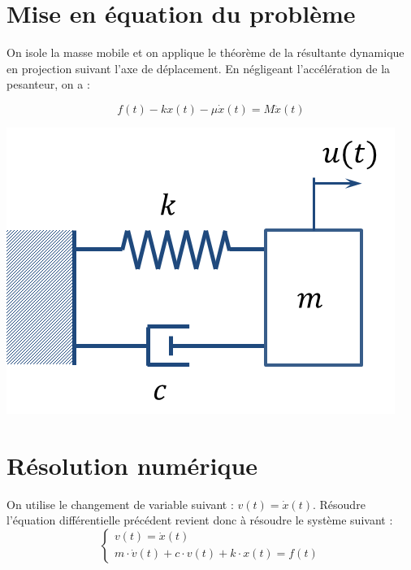 \documentclass[10pt]{article}
\begin{document}
\section{Mise en équation du problème}

\begin{minipage}[c]{.77\linewidth}
On isole la masse mobile et on applique le théorème de la résultante dynamique en projection suivant l'axe de déplacement. En négligeant l'accélération de la pesanteur, on a :

\begin{equation}
f(t)-kx(t)-\mu\dot{x}(t) = M\ddot{x}(t) 
\end{equation}


\end{minipage} \hfill
\begin{minipage}[c]{.2\linewidth}
\includegraphics[width=\textwidth]{images/cellule}
\end{minipage}

\section{Résolution numérique}
On utilise le changement de variable suivant : $v(t) = \dot{x}(t)$. Résoudre l'équation différentielle précédent revient donc à résoudre le système suivant : 
\begin{equation}
\left\{ 
\begin{array}{l} 
v(t) = \dot{x}(t) \\ 
m\cdot\dot{v}(t)+c\cdot {v}(t) + k\cdot x(t) = f(t)
\end{array} \right.
\end{equation}
\end{document}
